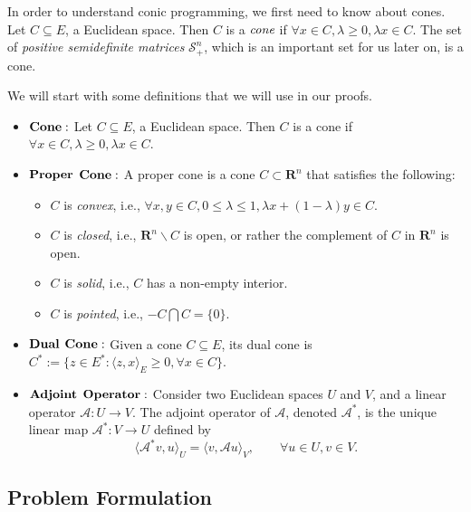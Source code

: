 	In order to understand conic programming, we first need to know about cones. Let $C \subseteq E$, a Euclidean space. Then $C$ is a $\emph{cone}$ if $\forall x \in C, \lambda \geq 0, \lambda x \in C$. The set of \emph{positive semidefinite matrices} $\mathcal{S}^n_+$, which is an important set for us later on, is a cone.	
	
	We will start with some definitions that we will use in our proofs. 
	
	\begin{itemize}
		\item $\bf{Cone:}$ Let $C \subseteq E$, a Euclidean space. Then $C$ is a cone if $\forall x \in C, \lambda \geq 0, \lambda x \in C$. 
		
		\item $\bf{Proper}$ $\bf{Cone:}$ A proper cone is a cone $C \subset \mathbf{R}^n$ that satisfies the following:
			\begin{itemize}
				\item $C$ is \emph{convex}, i.e., $\forall x, y \in C, 0 \leq \lambda \leq 1, \lambda x + (1 - \lambda) y \in C.$ 
				\item $C$ is \emph{closed}, i.e., $\mathbf{R}^n \backslash C$ is open, or rather the complement of $C$ in $\mathbf{R}^n$ is open.
				\item $C$ is \emph{solid}, i.e., $C$ has a non-empty interior.
				\item $C$ is \emph{pointed}, i.e., $-C \bigcap C = \{0\}$. 
			\end{itemize}
		
		\item $\bf{Dual}$ $\bf{Cone:}$ Given a cone $C \subseteq E$, its dual cone is $C^* := \{z \in E^* : \langle z,x \rangle_E \geq 0, \forall x \in C\}$.
		
		\item $\bf{Adjoint}$ $\bf{Operator:}$ Consider two Euclidean spaces $U$ and $V$, and a linear operator $\mathcal{A}: U \rightarrow V$. The adjoint operator of $\mathcal{A}$, denoted $\mathcal{A}^*$, is the unique linear map $\mathcal{A}^* : V \rightarrow U$ defined by 
		$$
		\langle \mathcal{A}^* v, u \rangle_U = \langle v, \mathcal{A} u \rangle_V, \qquad \forall u \in U, v \in V.
		$$
	\end{itemize}
	
	\subsection{Problem Formulation}
	
